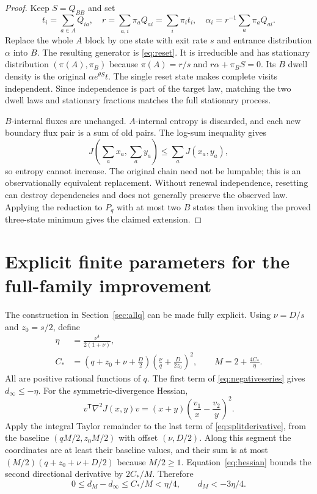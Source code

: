 \documentclass[11pt,a4paper]{article}
\theoremstyle{remark}\newtheorem{remark}[theorem]{Remark}
\begin{document}
\begin{proof}
Keep $S=Q_{BB}$ and set
\begin{equation}
 t_i=\sum_{a\in A}Q_{ia},\quad
 r=\sum_{a,i}\pi_aQ_{ai}=\sum_i\pi_it_i,\quad
 \alpha_i=r^{-1}\sum_a\pi_aQ_{ai}.
\end{equation}
Replace the whole $A$ block by one state with exit rate $s$ and entrance
distribution $\alpha$ into $B$. The resulting generator is
\eqref{eq:reset}. It is irreducible and has stationary distribution
$(\pi(A),\pi_B)$ because $\pi(A)=r/s$ and
$r\alpha+\pi_BS=0$. Its $B$ dwell density is the original
$\alpha e^{\theta S}t$. The single reset state makes complete visits independent.
Since independence is part of the target law, matching the two dwell laws and
stationary fractions matches the full stationary process.

$B$-internal fluxes are unchanged. $A$-internal entropy is discarded, and each
new boundary flux pair is a sum of old pairs. The log-sum inequality gives
\begin{equation}
 J\left(\sum_a x_a,\sum_a y_a\right)\leq\sum_aJ(x_a,y_a),
\end{equation}
so entropy cannot increase. The original chain need not be lumpable; this is
an observationally equivalent replacement. Without renewal independence,
resetting can destroy dependencies and does not generally preserve the
observed law. Applying the reduction to $P_q$ with at most two $B$ states
then invoking the proved three-state minimum gives the claimed extension.
\end{proof}

\section{Explicit finite parameters for the full-family improvement}
\label{app:explicit}

The construction in Section~\ref{sec:allq} can be made fully explicit.
Using $\nu =D/s$ and $z_0=s/2$, define
\begin{align}
 \eta&=\frac{\nu ^4}{2(1+\nu )},\nonumber\\
 C_*&=\left(q+z_0+\nu +\frac D2\right)
       \left(\frac \nu q+\frac{D}{2z_0}\right)^2,\qquad
 M=2+\frac{4C_*}{\eta}.
\end{align}
All are positive rational functions of $q$. The first term of
\eqref{eq:negativeseries} gives $d_\infty\leq-\eta$.
For the symmetric-divergence Hessian,
\begin{equation}\label{eq:hessian}
 v^{\mathsf T}\nabla^2J(x,y)v
 =(x+y)\left(\frac{v_1}{x}-\frac{v_2}{y}\right)^2.
\end{equation}
Apply the integral Taylor remainder to the last term of
\eqref{eq:splitderivative}, from the baseline $(qM/2,z_0M/2)$
with offset $(\nu ,D/2)$. Along this segment the coordinates are at least
their baseline values, and their sum is at most
$(M/2)(q+z_0+\nu +D/2)$ because $M/2\geq1$.
Equation~\eqref{eq:hessian} bounds the second directional derivative by
$2C_*/M$. Therefore
\begin{equation}
 0\leq d_M-d_\infty\leq C_*/M<\eta/4,
 \qquad d_M<-3\eta/4.
\end{equation}
\end{document}
